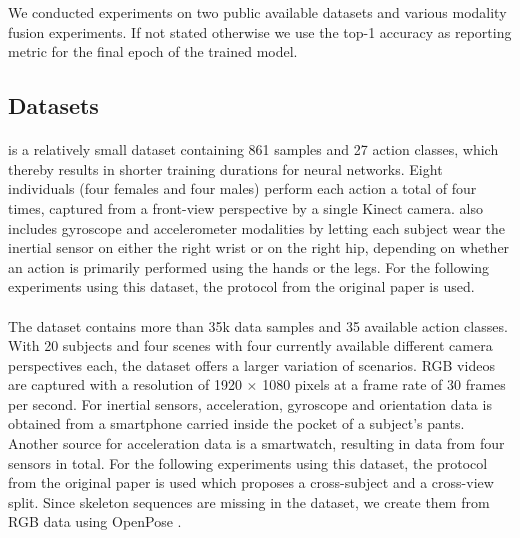 We conducted experiments on two public available datasets and various modality fusion experiments. 
If not stated otherwise we use the top-1 accuracy as reporting metric for the final epoch of the trained model.

\subsection{Datasets}

\paragraph{\utdmhad} 

\utdmhad{} \cite{DBLP:conf/icip/ChenJK15} is a relatively small dataset containing 861 samples and 27 action classes, which thereby results in shorter training durations for neural networks. Eight individuals (four females and four males) perform each action a total of four times, captured from a front-view perspective by a single Kinect camera. 
\utdmhad{} also includes gyroscope and accelerometer modalities by letting each subject wear the inertial sensor on either the right wrist or on the right hip, depending on whether an action is primarily performed using the hands or the legs. 
For the following experiments using this dataset, the protocol from the original paper \cite{DBLP:conf/icip/ChenJK15} is used.

\paragraph{\mmact}
The \mmact{} dataset \cite{DBLP:conf/iccv/KongWDKTM19} contains more than 35k data samples and
35 available action classes. With 20 subjects and four scenes with four currently available different camera perspectives each, the dataset offers a larger variation of scenarios.
RGB videos are captured with a resolution of 1920 $\times$ 1080 pixels at a frame rate of 30 frames per second. 
For inertial sensors, acceleration, gyroscope and orientation data is obtained from a smartphone carried inside the pocket of a subject's pants. Another source for acceleration data is a smartwatch, resulting in data from four sensors in total. For the following experiments using this dataset, the protocol from the original paper \cite{DBLP:conf/iccv/KongWDKTM19} is used which proposes a cross-subject and a cross-view split. Since skeleton sequences are missing in the dataset, we create them from RGB data using OpenPose \cite{DBLP:journals/pami/CaoHSWS21}.

